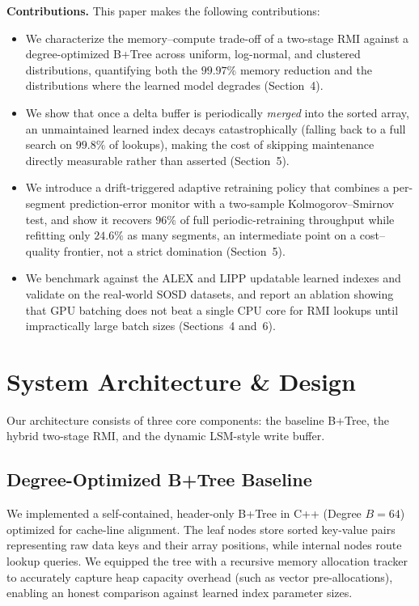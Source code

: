 \documentclass[sigconf, nonacm]{acmart}
\begin{document}
\medskip
\noindent\textbf{Contributions.} This paper makes the following contributions:
\begin{itemize}
    \item We characterize the memory--compute trade-off of a two-stage RMI against a degree-optimized B+Tree across uniform, log-normal, and clustered distributions, quantifying both the $99.97\%$ memory reduction and the distributions where the learned model degrades (Section~4).
    \item We show that once a delta buffer is periodically \emph{merged} into the sorted array, an unmaintained learned index decays catastrophically (falling back to a full search on $99.8\%$ of lookups), making the cost of skipping maintenance directly measurable rather than asserted (Section~5).
    \item We introduce a drift-triggered adaptive retraining policy that combines a per-segment prediction-error monitor with a two-sample Kolmogorov--Smirnov test, and show it recovers $96\%$ of full periodic-retraining throughput while refitting only $24.6\%$ as many segments, an intermediate point on a cost--quality frontier, not a strict domination (Section~5).
    \item We benchmark against the ALEX and LIPP updatable learned indexes and validate on the real-world SOSD datasets, and report an ablation showing that GPU batching does not beat a single CPU core for RMI lookups until impractically large batch sizes (Sections~4 and~6).
\end{itemize}

\section{System Architecture \& Design}
Our architecture consists of three core components: the baseline B+Tree, the hybrid two-stage RMI, and the dynamic LSM-style write buffer.

\subsection{Degree-Optimized B+Tree Baseline}
We implemented a self-contained, header-only B+Tree in C++ (Degree $B=64$) optimized for cache-line alignment. The leaf nodes store sorted key-value pairs representing raw data keys and their array positions, while internal nodes route lookup queries. We equipped the tree with a recursive memory allocation tracker to accurately capture heap capacity overhead (such as vector pre-allocations), enabling an honest comparison against learned index parameter sizes.
\end{document}
